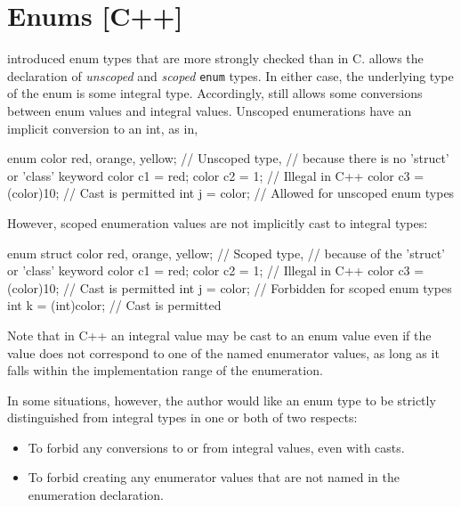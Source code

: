 \section{Enums [C++]}
\label{sec:enums}


\lang{} introduced enum types that are more strongly checked than in C. \lang{} allows the declaration of \textit{unscoped} and \textit{scoped} \lstinline|enum| types. In either case, the underlying type of the enum is some integral type. Accordingly, \lang{} still allows some conversions between enum values and integral values. Unscoped enumerations have an implicit conversion to an int, as in,

\begin{listing-nonumber}
enum color { red, orange, yellow}; // Unscoped type, 
                        // because there is no 'struct' or 'class' keyword
color c1 = red;
color c2 = 1; // Illegal in C++
color c3 = (color)10; // Cast is permitted
int j = color; // Allowed for unscoped enum types
\end{listing-nonumber}

However, scoped enumeration values are not implicitly cast to integral types:

\begin{listing-nonumber}
enum struct color { red, orange, yellow}; // Scoped type, 
                        // because of the 'struct' or 'class' keyword
color c1 = red;
color c2 = 1; // Illegal in C++
color c3 = (color)10; // Cast is permitted
int j = color; // Forbidden for scoped enum types
int k = (int)color; // Cast is permitted
\end{listing-nonumber}

Note that in C++ an integral value may be cast to an enum value even if the value does not correspond to one of the named
enumerator values, as long as it falls within the implementation range of the enumeration.

In some situations, however, the author would like an enum type to be strictly distinguished from integral types in one or both of two respects:
\begin{itemize}
\item To forbid any conversions to or from integral values, even with casts.
\item To forbid creating any enumerator values that are not named in the enumeration declaration.
\end{itemize}

